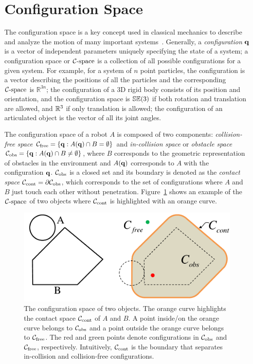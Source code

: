 \section{Configuration Space}
\label{sec:1:configurationSpace}
The configuration space is a key concept used in classical mechanics to describe and analyze the motion of many important systems~\cite{Arnold:1989}. Generally, a \emph{configuration} $\mathbf q$ is a vector of independent parameters uniquely specifying the state of a system; a configuration space or $\mathcal C\text{-space}$ is a collection of all possible configurations for a given system. For example, for a system of $n$ point particles, the configuration is a vector describing the positions of all the particles and the corresponding $\mathcal C\text{-space}$ is $\mathbb R^{3n}$; the configuration of a 3D rigid body consists of its position and orientation, and the configuration space is $\mathbb {SE}(3)$ if both rotation and translation are allowed, and $\mathbb R^3$ if only translation is allowed; the configuration of an articulated object is the vector of all its joint angles.

The configuration space of a robot $A$ is composed of two components: \emph{collision-free space} $\mathcal C_{\text{free}} = \{\mathbf q: A(\mathbf q) \cap B = \emptyset\}$ and \emph{in-collision space} or \emph{obstacle space} $\mathcal C_{\text{obs}} = \{\mathbf q: A(\mathbf q) \cap B \neq \emptyset\}$, where $B$ corresponds to the geometric representation of obstacles in the environment and $A(\mathbf q)$ corresponds to $A$ with the configuration $\mathbf q$. $\mathcal C_{\text{obs}}$ is a closed set and its boundary is denoted as the \emph{contact space} $\mathcal C_\text{cont} = \partial \mathcal C_{\text{obs}}$, which corresponds to the set of configurations where $A$ and $B$ just touch each other without penetration. Figure~\ref{fig:1:contactspace} shows an example of the $\mathcal C\text{-space}$ of two objects where $\mathcal C_\text{cont}$ is highlighted with an orange curve.

\begin{figure}[!htb]
  \centering
  \includegraphics[width=0.6\linewidth]{figs/1/Ccont.pdf}
  \caption[The configuration space of two objects]{The configuration space of two objects. The orange curve highlights the contact space $\mathcal C_\text{cont}$ of $A$ and $B$. A point inside/on the orange curve belongs to
  $\mathcal C_{\text{obs}}$ and a point outside the orange curve belongs to $\mathcal C_{\text{free}}$.
  The red and green points denote configurations in $\mathcal C_{\text{obs}}$ and $\mathcal C_{\text{free}}$, respectively. Intuitively, $\mathcal C_\text{cont}$ is the boundary that separates in-collision and collision-free configurations.}
  \label{fig:1:contactspace}
\end{figure}

